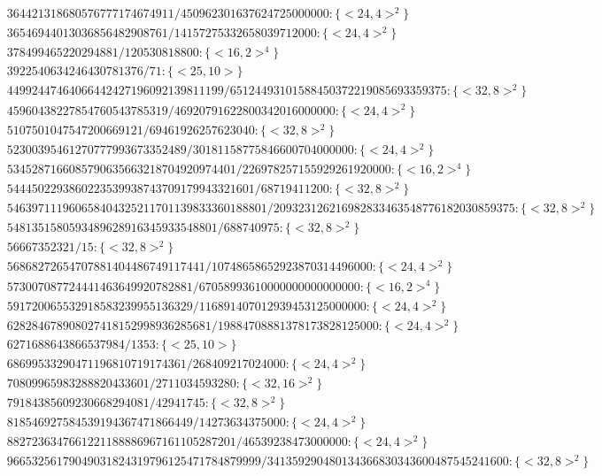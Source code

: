 \documentclass[11pt,reqno]{amsart}
\theoremstyle{plain}
\theoremstyle{definition}
\begin{document}
{\begin{align*}
&364421318680576777174674911/450962301637624725000000:\{ <24, 4>^2 \}\\
&36546944013036856482908761/14157275332658039712000:\{ <24, 4>^2 \}\\
&378499465220294881/120530818800:\{ <16, 2>^4 \}\\
&3922540634246430781376/71:\{ <25, 10> \}\\
&44992447464066442427196092139811199/65124493101588450372219085693359375:\{ <32, 8>^2 \}\\
&45960438227854760543785319/46920791622800342016000000:\{ <24, 4>^2 \}\\
&5107501047547200669121/69461926257623040:\{ <32, 8>^2 \}\\
&52300395461270777993673352489/30181158775846600704000000:\{ <24, 4>^2 \}\\
&5345287166085790635663218704920974401/226978257155929261920000:\{ <16, 2>^4 \}
\end{align*}
\begin{align*}
&5444502293860223539938743709179943321601/68719411200:\{ <32, 8>^2 \}\\
&546397111960658404325211701139833360188801/209323126216982833463548776182030859375:\{<32, 8>^2 \}\\
&5481351580593489628916345933548801/688740975:\{ <32, 8>^2 \}\\
&56667352321/15:\{ <32, 8>^2 \}\\
&56868272654707881404486749117441/10748658652923870314496000:\{ <24, 4>^2 \}\\
&573007087724441463649920782881/67058993610000000000000000:\{ <16, 2>^4 \}\\
&591720065532918583239955136329/116891407012939453125000000:\{ <24, 4>^2 \}\\
&628284678908027418152998936285681/19884708881378173828125000:\{ <24, 4>^2 \}\\
&6271688643866537984/1353:\{ <25, 10> \}\\
&68699533290471196810719174361/268409217024000:\{ <24, 4>^2 \}\\
&70809965983288820433601/2711034593280:\{ <32, 16>^2 \}\\
&79184385609230668294081/42941745:\{ <32, 8>^2 \}\\
&818546927584539194367471866449/14273634375000:\{ <24, 4>^2 \}\\
&8827236347661221188886967161105287201/46539238473000000:\{ <24, 4>^2 \}\\
&96653256179049031824319796125471784879999/341359290480134366830343600487545241600:\{ <32, 8>^2 \}
\end{align*}}
\vspace{20 mm}


\end{document}
